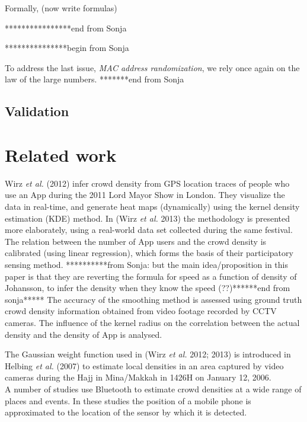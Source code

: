 \documentclass[10pt,a4paper]{article}
\begin{document}
Formally,  (now write formulas) 

****************end from Sonja

***************begin from Sonja

To address the last issue, {\it MAC address randomization}, we rely once again on the law of the large numbers. 
*******end from Sonja


\subsection{Validation}



\section{Related work}

Wirz \textit{et al.} (2012) \cite{wirz:1} infer crowd density from GPS location traces of people who use an App during the 2011 Lord Mayor Show in London. They visualize the data in real-time, and generate heat maps (dynamically) using the kernel density estimation (KDE) method. In (Wirz \textit{et al.} 2013) \cite{wirz:2} the methodology is presented more elaborately, using a real-world data set collected during the same festival. The relation between the number of App users and the crowd density is calibrated (using linear regression), which forms the basis of their participatory sensing method. **********from Sonja: but the main idea/proposition in this paper is that they are reverting the formula for speed as a function of density of Johansson, to infer the density when they know the speed (??)******end from sonja*****
The accuracy of the smoothing method is assessed using ground truth crowd density information obtained from video footage recorded by CCTV cameras. 
The influence of the kernel radius on the correlation between the actual density and the density of App is analysed.

The Gaussian weight function used in (Wirz \textit{et al.} 2012; 2013) \cite{wirz:1}\cite{wirz:2} is introduced in Helbing \textit{et al.} (2007) \cite{helbing:1} to estimate local densities in an area captured by video cameras during the Hajj in Mina/Makkah in 1426H on January 12, 2006.\\

A number of studies use Bluetooth to estimate crowd densities at a wide range of places and events.
In these studies the position of a mobile phone is approximated to the location of the sensor by which it is detected.
\end{document}
